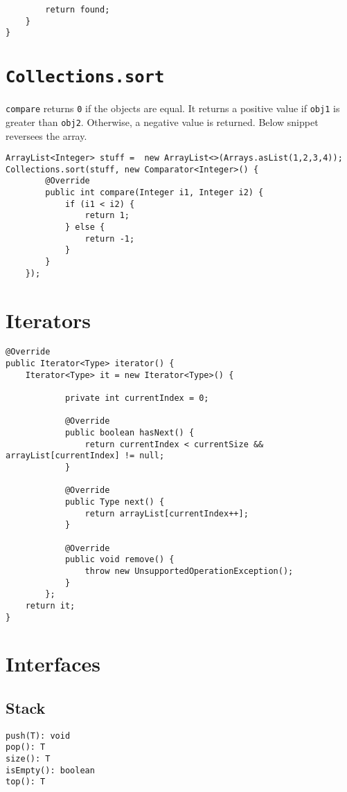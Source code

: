 \documentclass[11pt]{article}
\begin{document}
\begin{multicols*}{2}
\begin{verbatim}
        return found;
    }
}
\end{verbatim}
\section{\texttt{Collections.sort}}
\label{sec:org367f7cb}
\texttt{compare} returns \texttt{0} if the objects are equal. It returns a
positive value if \texttt{obj1} is greater than \texttt{obj2}. Otherwise, a negative
value is returned. Below snippet reversees the array.
\begin{verbatim}
ArrayList<Integer> stuff =  new ArrayList<>(Arrays.asList(1,2,3,4));
Collections.sort(stuff, new Comparator<Integer>() {
        @Override
        public int compare(Integer i1, Integer i2) {
            if (i1 < i2) {
                return 1;
            } else {
                return -1;
            }
        }
    });
\end{verbatim}
\section{Iterators}
\label{sec:org79314ba}
\begin{verbatim}
@Override
public Iterator<Type> iterator() {
    Iterator<Type> it = new Iterator<Type>() {

            private int currentIndex = 0;

            @Override
            public boolean hasNext() {
                return currentIndex < currentSize && arrayList[currentIndex] != null;
            }

            @Override
            public Type next() {
                return arrayList[currentIndex++];
            }

            @Override
            public void remove() {
                throw new UnsupportedOperationException();
            }
        };
    return it;
}
\end{verbatim}
\section{Interfaces}
\label{sec:orga1381c8}
\subsection{Stack}
\label{sec:org5b5efd7}
\begin{verbatim}
push(T): void
pop(): T
size(): T
isEmpty(): boolean
top(): T
\end{verbatim}

\end{multicols*}
\end{document}
